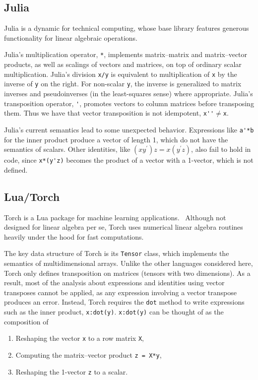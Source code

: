 \subsection{Julia}

Julia is a dynamic for technical computing, whose base library features
generous functionality for linear algebraic operations.~\cite{Bezanson2012}

Julia's multiplication operator, \verb|*|, implements matrix--matrix and
matrix--vector products, as well as scalings of vectors and matrices, on top of
ordinary scalar multiplication.
Julia's division \verb|x/y| is equivalent to multiplication of \verb|x| by the
inverse of \verb|y| on the right. For non-scalar \verb|y|, the inverse is
generalized to matrix inverses and pseudoinverses (in the least-squares sense)
where appropriate.
Julia's transposition operator, \verb|'|, promotes vectors to column matrices
before transposing them. Thus we have that vector transposition is not
idempotent, \verb|x''|$\ne$\verb|x|.

Julia's current semantics lead to some unexpected behavior. Expressions like
\verb|a'*b| for the inner product produce a vector of length 1, which do not
have the semantics of scalars. Other identities, like $(xy^\prime)z =
x(y^\prime z)$, also fail to hold in code, since \verb|x*(y'z)| becomes the
product of a vector with a 1-vector, which is not defined.


\subsection{Lua/Torch}

Torch is a Lua\cite{Lua} package for machine learning applications.~\cite{Torch}
Although not designed for linear algebra per se, Torch uses numerical linear
algebra routines heavily under the hood for fast computations.

The key data structure of Torch is its \verb|Tensor| class, which implements
the semantics of multidimensional arrays. Unlike the other languages considered
here, Torch only defines transposition on matrices (tensors with two
dimensions). As a result, most of the analysis about expressions and identities
using vector transposes cannot be applied, as any expression involving a vector
transpose produces an error.
Instead, Torch requires the \verb|dot| method to write expressions such as the inner product,
\verb|x:dot(y)|. \verb|x:dot(y)| can be thought of as the composition of
\begin{enumerate}

\item
Reshaping the vector \verb|x| to a row matrix \verb|X|,

\item
Computing the matrix--vector product \verb|z = X*y|,

\item
Reshaping the 1-vector \verb|z| to a scalar.

\end{enumerate}

